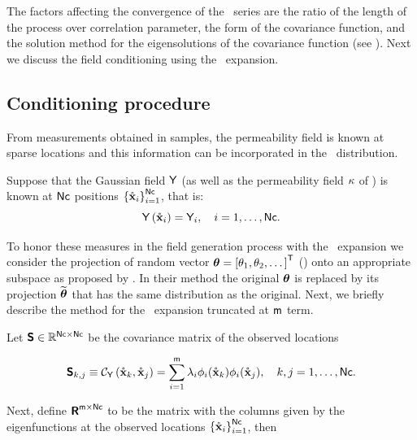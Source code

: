 The factors affecting the convergence of the \KL\ series are the ratio of the length of the process over correlation parameter, the form of the covariance function, and the solution method for the eigensolutions of the covariance function (see \cite{huang01}). 
Next we discuss the field conditioning using the \kl\ expansion.

\subsection{Conditioning procedure}\label{sec:klcond}

From measurements obtained in samples, the permeability field is known at sparse locations and this information can be incorporated in the \apri\ distribution.

Suppose that the Gaussian field $\mathsf{Y}$ (as well as the permeability field $\kappa$ of ) is known at $\mathsf{Nc}$ positions $\left\{ \mathring{\mathbf{x}}_{i}\right\}_{i=1}^{\mathsf{Nc}}$, that is:
\begin{equation}
 \mathsf{Y} \left( \mathring{\mathbf{x}}_{i} \right) = \mathsf{Y}_{i},\quad i=1,\dots,\mathsf{Nc}.
\end{equation}

To honor these measures in the field generation process with the \kl\ expansion we consider the projection of random vector $\boldsymbol{\theta} = \left[\theta_{1}, \theta_{2},\dots  \right]^{\mathsf{T}}$ () onto an appropriate subspace as proposed by \cite{Ossiander2014}.
In their method the original $\boldsymbol{\theta}$ is replaced by its projection $\widetilde{\boldsymbol{\theta}}$ that has the same distribution as the original. 
Next, we briefly describe the method for the \kl\ expansion truncated at $\mathsf{m}$ term.

Let $\boldsymbol{\mathsf{S}}\in\mathbb{R}^{\mathsf{Nc}\times\mathsf{Nc}}$ be the covariance matrix of the observed locations

\begin{equation}
 \boldsymbol{\mathsf{S}}_{k,j} \equiv \mathcal{C}_{\mathsf{Y}}\left( \mathring{\mathbf{x}}_{k}, \mathring{\mathbf{x}}_{j} \right) =
 \sum_{i=1}^{\mathsf{m}} \lambda_{i}\phi_{i}(\mathring{\mathbf{x}}_{k})\phi_{i}(\mathring{\mathbf{x}}_{j}),
 \quad k,j = 1,\dots,\mathsf{Nc}.
\end{equation}

\noindent Next, define $\boldsymbol{\mathsf{R}}^{\mathsf{m}\times\mathsf{Nc}}$ to be the matrix with the columns given by the eigenfunctions at the observed locations $\left\{ \mathring{\mathbf{x}}_{i}\right\}_{i=1}^{\mathsf{Nc}}$, then

